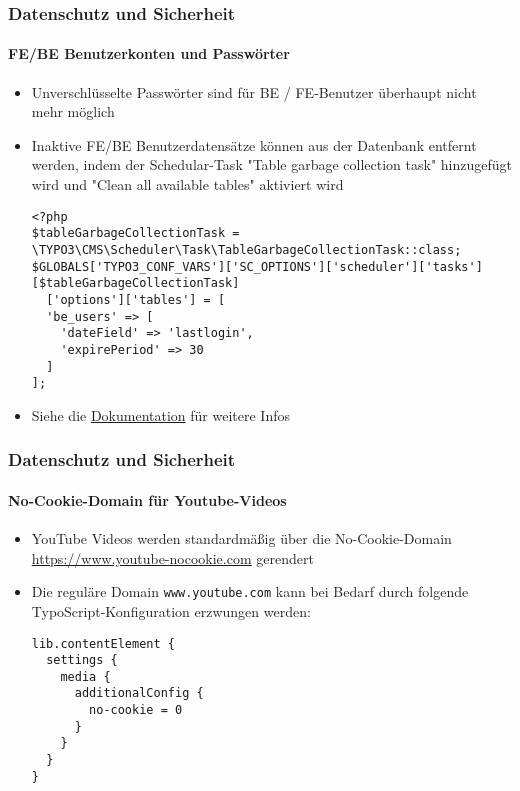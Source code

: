 \begin{frame}[fragile]
	\frametitle{Datenschutz und Sicherheit}
	\framesubtitle{FE/BE Benutzerkonten und Passwörter}

	\lstset{basicstyle=\tiny\ttfamily}

	\begin{itemize}
		\item Unverschlüsselte Passwörter sind für BE / FE-Benutzer überhaupt nicht mehr möglich
		\item Inaktive FE/BE Benutzerdatensätze können aus der Datenbank entfernt werden, 
			indem der Schedular-Task "Table garbage collection task" hinzugefügt wird und
			"Clean all available tables" aktiviert wird\newline
			\smaller

\begin{lstlisting}
<?php
$tableGarbageCollectionTask = \TYPO3\CMS\Scheduler\Task\TableGarbageCollectionTask::class;
$GLOBALS['TYPO3_CONF_VARS']['SC_OPTIONS']['scheduler']['tasks'][$tableGarbageCollectionTask]
  ['options']['tables'] = [
  'be_users' => [
    'dateField' => 'lastlogin',
    'expirePeriod' => 30
  ]
];
\end{lstlisting}

		\item Siehe die \href{https://docs.typo3.org/typo3cms/extensions/scheduler/Installation/BaseTasks/Index.html}{Dokumentation} für weitere Infos
	\end{itemize}

\end{frame}


\begin{frame}[fragile]
	\frametitle{Datenschutz und Sicherheit}
	\framesubtitle{No-Cookie-Domain für Youtube-Videos}

	\lstset{basicstyle=\tiny\ttfamily}

	\begin{itemize}
		\item YouTube Videos werden standardmäßig über die No-Cookie-Domain
			\url{https://www.youtube-nocookie.com} gerendert
		\item Die reguläre Domain \texttt{www.youtube.com} kann bei Bedarf
			durch folgende TypoScript-Konfiguration erzwungen werden:

\begin{lstlisting}
lib.contentElement {
  settings {
    media {
      additionalConfig {
        no-cookie = 0
      }
    }
  }
}
\end{lstlisting}

	\end{itemize}

\end{frame}

